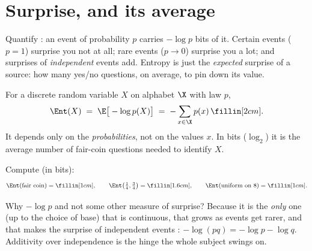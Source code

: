 \section{Surprise, and its average}\label{sec:entropy}
\quad{}

\begin{strand}
Quantify : an event of probability $p$ carries $-\log p$ bits of it. Certain
events ($p=1$) surprise you not at all; rare events ($p\to0$) surprise you a lot; and surprises
of \emph{independent} events add. Entropy is just the \emph{expected} surprise of a source: how
many yes/no questions, on average, to pin down its value.
\end{strand}


\begin{definition}[entropy]\label{def:entropy}
For a discrete random variable $X$ on alphabet $\X$ with law $p$,
\[
  \Ent(X)\;=\;\E\big[-\log p(X)\big]\;=\;-\sum_{x\in\X} p(x)\,\fillin[2cm].
\]
It depends only on the \emph{probabilities}, not on the values $x$. In bits ($\log_2$) it is the
average number of fair-coin questions needed to identify $X$.
\end{definition}


\begin{yourturn}
Compute (in bits):
\[
  \Ent(\text{fair coin})=\fillin[1cm],\qquad
  \Ent\big(\tfrac14,\tfrac34\big)=\fillin[1.6cm],\qquad
  \Ent(\text{uniform on } 8)=\fillin[1cm].
\]
\end{yourturn}

\begin{strand}
Why $-\log p$ and not some other measure of surprise? Because it is the \emph{only} one (up to the
choice of base) that is continuous, that grows as events get rarer, and that makes the surprise of
independent events : $-\log(pq)=-\log p-\log q$. Additivity over independence is the
hinge the whole subject swings on.
\end{strand}


